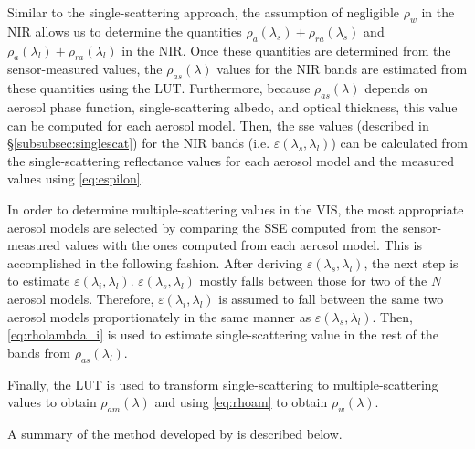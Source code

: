 Similar to the single-scattering approach, the assumption of negligible $\rho_w$ in the NIR allows us to determine the quantities $\rho_a(\lambda_s)+\rho_{ra}(\lambda_s)$ and $\rho_a(\lambda_l)+\rho_{ra}(\lambda_l)$ in the NIR. Once these quantities are determined from the sensor-measured values, the $\rho_{as}(\lambda)$ values for the NIR bands are estimated from these quantities using the LUT. Furthermore, because $\rho_{as}(\lambda)$ depends on aerosol phase function, single-scattering albedo, and optical thickness, this value can be computed for each aerosol model. Then, the \gls{sse}  values (described in \S\ref{subsubsec:singlescat}) for the NIR bands (i.e. $\varepsilon(\lambda_s,\lambda_l)$) can be calculated from the single-scattering reflectance values for each aerosol model and the measured values using \autoref{eq:espilon}. 

In order to determine multiple-scattering values in the VIS, the most appropriate aerosol models are selected by comparing the SSE computed from the sensor-measured values with the ones computed from each aerosol model. This is accomplished in the following fashion. After deriving $\varepsilon(\lambda_s,\lambda_l)$, the next step is to estimate $\varepsilon(\lambda_i,\lambda_l)$. $\varepsilon(\lambda_s,\lambda_l)$ mostly falls between those for two of the $N$ aerosol models. Therefore, $\varepsilon(\lambda_i,\lambda_l)$ is assumed to fall between the same two aerosol models proportionately in the same manner as $\varepsilon(\lambda_s,\lambda_l)$. Then, \autoref{eq:rholambda_i} is used to estimate single-scattering value in the rest of the bands from $\rho_{as}(\lambda_l)$. 

Finally, the LUT is used to transform single-scattering to multiple-scattering values to obtain $\rho_{am}(\lambda)$ and using \autoref{eq:rhoam} to obtain $\rho_w(\lambda)$. 

A summary of the method developed by \cite{Gordon:1994} is described below.

